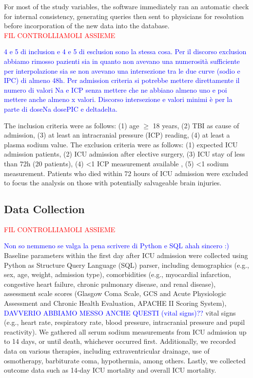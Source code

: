 For most of the study variables, the software immediately ran an automatic check for internal consistency, generating queries then sent to physicians for resolution before incorporation of the new data into the database.\\

\textcolor{red}{FIL CONTROLLIAMOLI ASSIEME}

\textcolor{blue}{4 e 5 di inclusion e 4 e 5 di esclusion sono la stessa cosa. Per il discorso exclusion abbiamo rimosso pazienti sia in quanto non avevano una numerosità sufficiente per interpolazione sia se non avevano una intersezione tra le due curve (sodio e IPC) di almeno 48h. Per admission criteria si potrebbe mettere direttamente il numero di valori Na e ICP senza mettere che ne abbiano almeno uno e poi mettere anche almeno x valori.
Discorso intersezione e valori minimi è per la parte di doseNa dosePIC e deltadelta.}

The inclusion criteria were as follows: (1) age $\geq$ 18 years, (2) TBI as cause of admission, (3) at least an intracranial pressure (ICP) reading, (4) at least a plasma sodium value.
The exclusion criteria were as follows: (1) expected ICU admission patients, (2) ICU admission after elective surgery, (3) ICU stay of less than 72h (20 patients), (4) <1 ICP measurement available , (5) <1 sodium measurement. Patients who died within 72 hours of ICU admission were excluded to focus the analysis on those with potentially salvageable brain injuries.

\subsection{Data Collection}
\textcolor{red}{FIL CONTROLLIAMOLI ASSIEME}

\textcolor{blue}{Non so nemmeno se valga la pena scrivere di Python e SQL ahah sincero :)}
Baseline parameters within the first day after ICU admission were collected using Python as  Structure Query Language (SQL) parser, including demographics (e.g., sex, age, weight, admission type), comorbidities (e.g., myocardial infarction, congestive heart failure, chronic pulmonary disease, and renal disease), assessment scale scores (Glasgow Coma Scale, GCS and Acute Physiologic Assessment and Chronic Health Evaluation, APACHE II Scoring System), \textcolor{blue}{DAVVERIO ABBIAMO MESSO ANCHE QUESTI (vital signs)??} vital signs (e.g., heart rate, respiratory rate, blood pressure, intracranial pressure and pupil reactivity). 
We gathered all serum sodium measurements from ICU admission up to 14 days, or until death, whichever occurred first. Additionally, we recorded data on various therapies, including extraventricular drainage, use of osmotherapy, barbiturate coma, hypothermia, among others. Lastly, we collected outcome data such as 14-day ICU mortality and overall ICU mortality.

